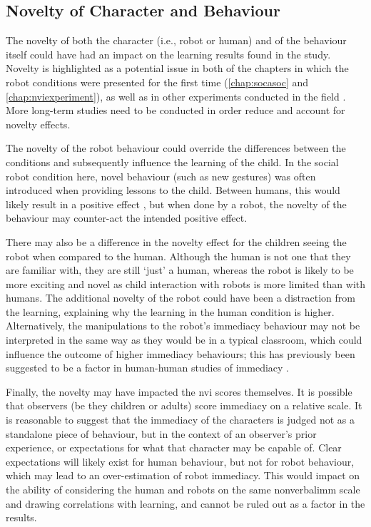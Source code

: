 \subsection{Novelty of Character and Behaviour}
The novelty of both the character (i.e., robot or human) and of the behaviour itself could have had an impact on the \gls{learning} results found in the study. Novelty is highlighted as a potential issue in both of the chapters in which the robot conditions were presented for the first time (\ref{chap:socasoc} and \ref{chap:nviexperiment}), as well as in other experiments conducted in the field \citep{kanda2004interactive, sung2009robots}. More long-term studies need to be conducted in order reduce and account for novelty effects.

The novelty of the robot behaviour could override the differences between the conditions and subsequently influence the \gls{learning} of the child. In the social robot condition here, novel behaviour (such as new gestures) was often introduced when providing lessons to the child. Between humans, this would likely result in a positive effect \citep{goldin2001explaining}, but when done by a robot, the novelty of the behaviour may counter-act the intended positive effect.

There may also be a difference in the novelty effect for the children seeing the robot when compared to the human. Although the human is not one that they are familiar with, they are still `just' a human, whereas the robot is likely to be more exciting and novel as child interaction with robots is more limited than with humans. The additional novelty of the robot could have been a distraction from the \gls{learning}, explaining why the \gls{learning} in the human condition is higher. Alternatively, the manipulations to the robot's immediacy behaviour may not be interpreted in the same way as they would be in a typical classroom, which could influence the outcome of higher immediacy behaviours; this has previously been suggested to be a factor in human-human studies of immediacy \citep{christensen1998linear}.

Finally, the novelty may have impacted the \acrshort{nvi} scores themselves. It is possible that observers (be they children or adults) score immediacy on a relative scale. It is reasonable to suggest that the immediacy of the characters is judged not as a standalone piece of behaviour, but in the context of an observer's prior experience, or expectations for what that character may be capable of. Clear expectations will likely exist for human behaviour, but not for robot behaviour, which may lead to an over-estimation of robot immediacy. This would impact on the ability of considering the human and robots on the same \gls{nonverbalimm} scale and drawing correlations with \gls{learning}, and cannot be ruled out as a factor in the results.

